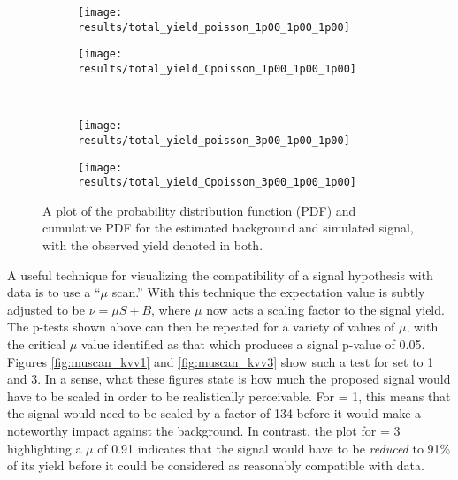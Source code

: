     \begin{figure}[!htbp]
        \centering
        \begin{subfigure}{0.48\textwidth} 
            \texttt{[image: results/total\_yield\_poisson\_1p00\_1p00\_1p00]}
            \caption{}%
            \label{fig:poisson_sig_kvv1_pdf}
        \end{subfigure}
        \begin{subfigure}{0.48\textwidth}
            \texttt{[image: results/total\_yield\_Cpoisson\_1p00\_1p00\_1p00]}
            \caption{}%
            \label{fig:poisson_sig_kvv1_Cpdf}
        \end{subfigure}\\
        \begin{subfigure}{0.48\textwidth} 
            \texttt{[image: results/total\_yield\_poisson\_3p00\_1p00\_1p00]}
            \caption{}%
            \label{fig:poisson_sig_kvv3_pdf}
        \end{subfigure}
        \begin{subfigure}{0.48\textwidth}
            \texttt{[image: results/total\_yield\_Cpoisson\_3p00\_1p00\_1p00]}
            \caption{}%
            \label{fig:poisson_sig_kvv3_Cpdf}
        \end{subfigure}
        \caption{
            A plot of the probability distribution function (PDF)
                and cumulative PDF for the estimated background and simulated signal,
                with the observed yield denoted in both.
        }
    \end{figure}

    A useful technique for visualizing the compatibility of a signal hypothesis with data is to use a ``$\mu$ scan.''
    With this technique the expectation value is subtly adjusted to be $\nu = \mu S + B$,
        where $\mu$ now acts a scaling factor to the signal yield.
    The p-tests shown above can then be repeated for a variety of values of $\mu$,
        with the critical $\mu$ value identified as that which produces a signal p-value of 0.05.
    Figures \ref{fig:muscan_kvv1} and \ref{fig:muscan_kvv3} show such a test for \kvv set to 1 and 3.
    In a sense, what these figures state is how much the proposed signal would have to be scaled in order to be realistically perceivable.
    For \kvv = 1, this means that the signal would need to be scaled by a factor of 134 before it would make a noteworthy impact against the background.
    In contrast, the plot for \kvv = 3 highlighting a $\mu$ of 0.91 indicates
        that the signal would have to be \textit{reduced} to 91\% of its yield before it could be considered as reasonably compatible with data.

